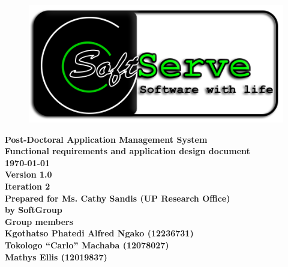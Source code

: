 \documentclass[12pt]{article}
\newcommand{\Title}{Functional requirements and application design document} %
\newcommand{\ssr}{Soft\color{green}{Serve }\color{black}}
\newcommand{\version}{1.0}
\newcommand{\iteration}{2}
\newcommand{\client}{Ms. Cathy Sandis (UP Research Office)}
\newcommand{\project}{Post-Doctoral Application Management System}
\begin{document}
\vspace{4em}

\begin{center}%

\begin{figure}[ht!]
\centering
\includegraphics{../Images_Docs/logo.png}
\end{figure}
\LARGE \bf \project \\[1em]
\LARGE \bf \Title \\[0.25em]
\large \bf \today\\
\bf Version \version\\
\bf Iteration \iteration\\[0.5em]
\Large \bf Prepared for \client\\
\Large \bf by
\Large {\bf \ssr Group }\\[0.5em]
\LARGE {\bf Group members}\\[0.25em]
\large
Kgothatso Phatedi Alfred Ngako (12236731) \\[0.5em]
Tokologo “Carlo” Machaba (12078027) \\[0.5em]
Mathys Ellis (12019837) \\[8em]

\end{center}%

\end{document}

